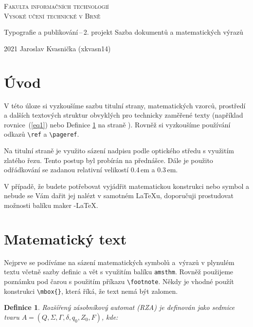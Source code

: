 \documentclass[11pt,a4paper,twocolumn]{article}
\newtheorem{definition}{Definice}
\begin{document}
\begin{titlepage}
\begin{center}
\Huge\textsc{Fakulta informačních technologií \\ Vysoké učení technické v Brně}\

\LARGE Typografie a publikování\,--\,2. projekt \linebreak Sazba dokumentů a matematických výrazů\
\end{center}
{\Large 2021 \hfill
Jaroslav Kvasnička (xkvasn14)}
\end{titlepage}




\section*{Úvod}
V této úloze si vyzkoušíme sazbu titulní strany, matematických vzorců, prostředí a dalších textových struktur obvyklých pro technicky zaměřené texty (například rovnice~(\ref{eq1})
nebo Definice \ref{def1} na straně \pageref{def1}). Rovněž si vyzkoušíme používání odkazů \verb|\ref| a \verb|\pageref|.\par
Na titulní straně je využito sázení nadpisu podle optického středu s využitím zlatého řezu. Tento postup byl
probírán na přednášce. Dále je použito odřádkování se
zadanou relativní velikostí 0.4\,em a 0.3\,em.\par
V případě, že budete potřebovat vyjádřit matematickou
konstrukci nebo symbol a nebude se Vám dařit jej nalézt
v samotném {\LaTeX}u, doporučuji prostudovat možnosti balíku maker \AmS-\LaTeX.


\section{Matematický text}
Nejprve se podíváme na sázení matematických symbolů a~výrazů v plynulém textu včetně sazby definic a vět s využitím balíku \verb|amsthm|. Rovněž použijeme poznámku pod
čarou s použitím příkazu \verb|\footnote|. Někdy je vhodné
použít konstrukci \verb|\mbox{}|, která říká, že text nemá být zalomen.

\begin{definition}\label{def1}
\textnormal{Rozšířený zásobníkový automat} (RZA) je definován jako sedmice tvaru $A = (Q, \Sigma, \Gamma, \delta, q_0, Z_0, F)$, kde:
\end{definition}
\end{document}
